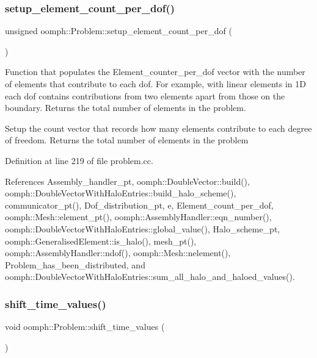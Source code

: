 \subsubsection{\texorpdfstring{setup\+\_\+element\+\_\+count\+\_\+per\+\_\+dof()}{setup\_element\_count\_per\_dof()}}
{\footnotesize\ttfamily unsigned oomph\+::\+Problem\+::setup\+\_\+element\+\_\+count\+\_\+per\+\_\+dof (\begin{DoxyParamCaption}{ }\end{DoxyParamCaption})\hspace{0.3cm}{\ttfamily [protected]}}



Function that populates the Element\+\_\+counter\+\_\+per\+\_\+dof vector with the number of elements that contribute to each dof. For example, with linear elements in 1D each dof contains contributions from two elements apart from those on the boundary. Returns the total number of elements in the problem. 

Setup the count vector that records how many elements contribute to each degree of freedom. Returns the total number of elements in the problem 

Definition at line 219 of file problem.\+cc.



References Assembly\+\_\+handler\+\_\+pt, oomph\+::\+Double\+Vector\+::build(), oomph\+::\+Double\+Vector\+With\+Halo\+Entries\+::build\+\_\+halo\+\_\+scheme(), communicator\+\_\+pt(), Dof\+\_\+distribution\+\_\+pt, e, Element\+\_\+count\+\_\+per\+\_\+dof, oomph\+::\+Mesh\+::element\+\_\+pt(), oomph\+::\+Assembly\+Handler\+::eqn\+\_\+number(), oomph\+::\+Double\+Vector\+With\+Halo\+Entries\+::global\+\_\+value(), Halo\+\_\+scheme\+\_\+pt, oomph\+::\+Generalised\+Element\+::is\+\_\+halo(), mesh\+\_\+pt(), oomph\+::\+Assembly\+Handler\+::ndof(), oomph\+::\+Mesh\+::nelement(), Problem\+\_\+has\+\_\+been\+\_\+distributed, and oomph\+::\+Double\+Vector\+With\+Halo\+Entries\+::sum\+\_\+all\+\_\+halo\+\_\+and\+\_\+haloed\+\_\+values().

\mbox{\label{classoomph_1_1Problem_aab27bdd1968e57cb3dffe78c1d63f762}} 
\subsubsection{\texorpdfstring{shift\+\_\+time\+\_\+values()}{shift\_time\_values()}}
{\footnotesize\ttfamily void oomph\+::\+Problem\+::shift\+\_\+time\+\_\+values (\begin{DoxyParamCaption}{ }\end{DoxyParamCaption})\hspace{0.3cm}{\ttfamily [virtual]}}



